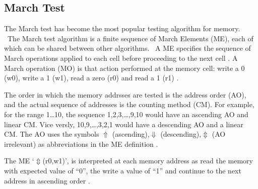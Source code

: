 \subsection{March Test}
The March test has become the most popular testing algorithm for memory.  The March test algorithm is a finite sequence of March Elements (ME), each of which can be shared between other algorithms.  A ME specifies the sequence of March operations applied to each cell before proceeding to the next cell \cite{199799}.  A March operation (MO) is that action performed at the memory cell: write a 0 (w0), write a 1 (w1), read a zero (r0) and read a 1 (r1) \cite{199799}.

The order in which the memory addrsses are tested is the address order (AO), and the actual sequence of addresses is the counting method (CM).  For example, for the range 1\ldots10, the sequence 1,2,3,\ldots,9,10 would have an ascending AO and linear CM.  Vice versly, 10,9,\ldots,3,2,1 would have a descending AO and a linear CM. The AO uses the symbols $\Uparrow$ (ascending),$\Downarrow$ (descending),$\Updownarrow$ (AO irrelevant) as abbreviations in the ME definition \cite{199799}.

The ME ‘$\Updownarrow$(r0,w1)’, is interpreted at each memory address as read the memory with expected value of “0”, the write a value of “1” and continue to the next address in ascending order \cite{5491773}.    


